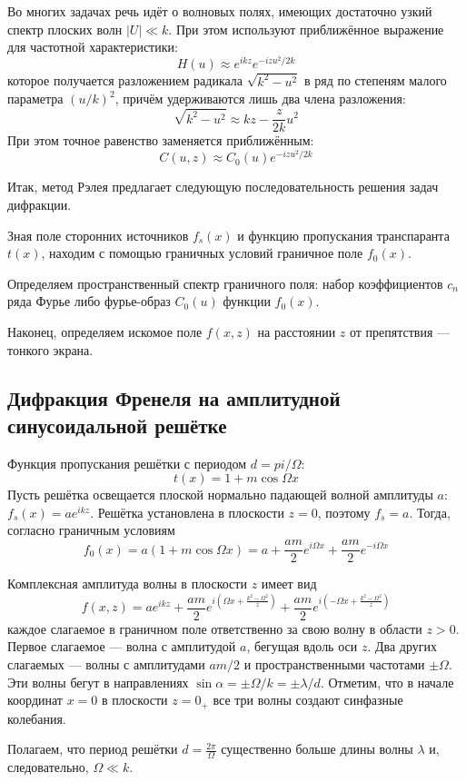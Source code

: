 Во многих задачах речь идёт о волновых полях, имеющих достаточно узкий спектр плоских волн $|U| \ll k$. При этом используют приближённое выражение для частотной характеристики:
\[
H(u) \approx e^{ikz}e^{-izu^2/2k}
\]
которое получается разложением радикала $\sqrt{k^2-u^2}$ в ряд по степеням малого параметра $(u / k)^2$, причём удерживаются лишь два члена разложения:
\[
\sqrt{k^2-u^2} \approx kz - \frac{z}{2k}u^2
\]
При этом точное равенство заменяется приближённым:
\[
C(u, z) \approx C_0(u)e^{-izu^2/2k}
\]

Итак, метод Рэлея предлагает следующую последовательность решения задач дифракции.

Зная поле сторонних источников $f_s(x)$ и функцию пропускания транспаранта $t(x)$, находим с помощью граничных условий граничное поле $f_0(x)$.

Определяем пространственный  спектр граничного поля: набор коэффициентов $c_n$ ряда Фурье либо фурье-образ $C_0(u)$ функции $f_0(x)$.

 Наконец, определяем искомое поле $f(x, z)$ на расстоянии $z$ от препятствия ---  тонкого экрана.

\subsection{Дифракция Френеля на амплитудной синусоидальной решётке}
Функция пропускания решётки с периодом $d=pi/\Omega$:
\[t(x) = 1 + m\cos\Omega x\]
Пусть решётка освещается плоской нормально падающей волной амплитуды $a$: $f_s(x) = ae^{ikz}$. Решётка установлена в плоскости $z=0$, поэтому $f_s = a$. Тогда, согласно граничным условиям
\[
f_0(x) = a(1 + m\cos\Omega x) = a + \frac{am}{2} e^{i\Omega x} + \frac{am}{2} e^{-i\Omega x}
\]

Комплексная амплитуда волны в плоскости $z$ имеет вид
\[
f(x, z) = ae^{ikz} + \frac{am}{2}e^{i(\Omega x + \frac{k^2-\Omega^2}z)} + \frac{am}{2}e^{i(-\Omega x + \frac{k^2-\Omega^2}z)}
\]
каждое слагаемое в граничном поле ответственно за свою волну в области $z>0$.  Первое слагаемое --- волна с амплитудой $a$, бегущая вдоль оси $z$. Два других слагаемых --- волны с амплитудами $am/2$ и пространственными частотами $\pm \Omega$. Эти волны бегут в направлениях $\sin\alpha = \pm \Omega / k = \pm \lambda / d$. Отметим, что в начале координат $x=0$ в плоскости $z=0_+$ все три волны создают синфазные колебания.

Полагаем, что период решётки $d = \frac{2\pi}{\Omega}$ существенно больше длины волны $\lambda$ и, следовательно, $\Omega \ll k$.

